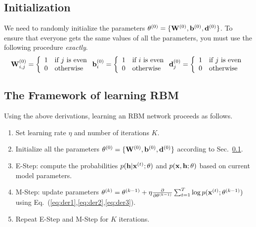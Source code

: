 \documentclass[11pt]{article}
\newcommand{\vx}{{\bf x}}
\newcommand{\vh}{{\bf h}}
\newcommand{\vb}{{\bf b}}
\newcommand{\vd}{{\bf d}}
\newcommand{\W}{{\bf W}}
\newcommand{\code}[1]{{\footnotesize \tt #1}}
\begin{document}
\subsection{Initialization}
\label{sec:init}
We need to randomly initialize the parameters $\theta^{(0)}=\{\W^{(0)},\vb^{(0)},\vd^{(0)}\}$. To ensure that everyone gets the same values of all the parameters, you must use the following procedure {\em exactly}. 
\begin{eqnarray}
\W^{(0)}_{i,j}=\left\{ \begin{array}{ll}
1 & \textrm{if $j$ is even} \\
0 & \textrm{otherwise}
\end{array} \right.
\vb^{(0)}_{i}=\left\{ \begin{array}{ll}
1 & \textrm{if $i$ is even} \\
0 & \textrm{otherwise}
\end{array} \right.
\vd^{(0)}_{j}=\left\{ \begin{array}{ll}
1 & \textrm{if $j$ is even} \\
0 & \textrm{otherwise}
\end{array} \right.
\end{eqnarray}
\subsection{The Framework of learning RBM}
Using the above derivations, learning an RBM network proceeds as follows.
\begin{enumerate}
\item Set learning rate $\eta$ and number of iterations $K$.
\item Initialize all the parameters $\theta^{(0)}=\{\W^{(0)},\vb^{(0)},\vd^{(0)}\}$ according to Sec.~\ref{sec:init}.
\item E-Step: compute the probabilities $p(\vh|\vx^{(t)};\theta)$ and $p(\vx,\vh;\theta)$ based on current model parameters.
\item M-Step: update parameters $\theta^{(k)}=\theta^{(k-1)}+\eta \frac{\partial}{\partial \theta^{(k-1)}} \sum_{t=1}^T \log p(\vx^{(t)};\theta^{(k-1)})$ using Eq.~(\ref{eq:der1},\ref{eq:der2},\ref{eq:der3}).
\item Repeat E-Step and M-Step for $K$ iterations.
\end{enumerate}
\end{document}
